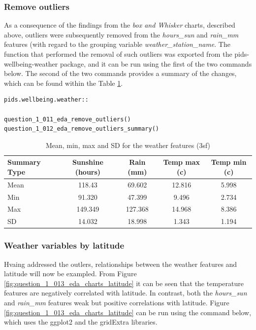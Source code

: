 \documentclass[12pt, oneside, openany]{book}
\begin{document}
\subsubsection*{Remove outliers}
As a consequence of the findings from the \emph{box and Whisker} charts, described above, outliers were subsequently removed from the \emph{hours\_sun} and \emph{rain\_mm} features (with regard to the grouping variable \emph{weather\_station\_name}. The function that performed the removal of such outliers was exported from the pids-wellbeing-weather package, and it can be run using the first of the two commands below. The second of the two commands provides a summary of the changes, which can be found within the Table \ref{table:question_1_012_eda_remove_outliers_summary}.
\bigskip
\begin{lstlisting}
pids.wellbeing.weather::

question_1_011_eda_remove_outliers()
question_1_012_eda_remove_outliers_summary()
\end{lstlisting}

\begin{table}[h!]
	\centering
	\begin{tabular}{ |l|c|c|c|c| }
		\hline
		Summary Type & Sunshine (hours) & Rain (mm) & Temp max (c) & Temp min (c)\\
		\hline
		\hline
		Mean & 118.43  & 69.602  & 12.816 & 5.998 \\
		Min & 91.320  & 47.399  & 9.496   & 2.734 \\
		Max & 149.349 & 127.368  & 14.968  & 8.386 \\
		SD & 14.032  & 18.998   & 1.343  & 1.194 \\
		\hline
	\end{tabular}
	\caption{Mean, min, max and SD for the weather features (3sf)}
	\label{table:question_1_012_eda_remove_outliers_summary}
\end{table}

\subsubsection*{Weather variables by latitude}
Hvaing addressed the outlers, relationships between the weather features and latitude will now be exampled. From Figure \ref{fig:question_1_013_eda_charts_latitude} it can be seen that the temperature features are negatively correlated with latitude. In contrast, both the \emph{hours\_sun} and \emph{rain\_mm} features weak but positive correlations with latitude. Figure \ref{fig:question_1_013_eda_charts_latitude} can be run using the command below, which uses the ggplot2 and the gridExtra libraries. 
	
\end{document}
